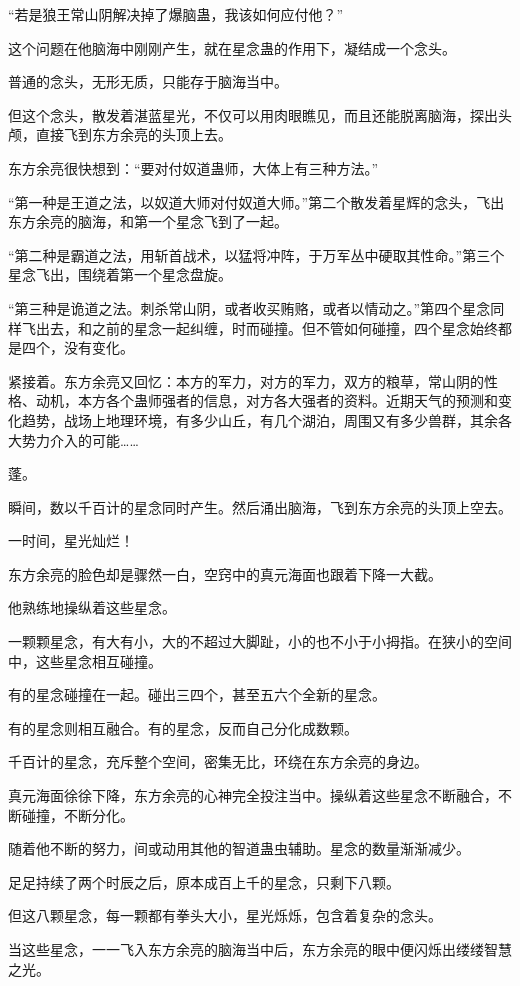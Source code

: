 \begin{this_body}
“若是狼王常山阴解决掉了爆脑蛊，我该如何应付他？”

这个问题在他脑海中刚刚产生，就在星念蛊的作用下，凝结成一个念头。

普通的念头，无形无质，只能存于脑海当中。

但这个念头，散发着湛蓝星光，不仅可以用肉眼瞧见，而且还能脱离脑海，探出头颅，直接飞到东方余亮的头顶上去。

东方余亮很快想到：“要对付奴道蛊师，大体上有三种方法。”

“第一种是王道之法，以奴道大师对付奴道大师。”第二个散发着星辉的念头，飞出东方余亮的脑海，和第一个星念飞到了一起。

“第二种是霸道之法，用斩首战术，以猛将冲阵，于万军丛中硬取其性命。”第三个星念飞出，围绕着第一个星念盘旋。

“第三种是诡道之法。刺杀常山阴，或者收买贿赂，或者以情动之。”第四个星念同样飞出去，和之前的星念一起纠缠，时而碰撞。但不管如何碰撞，四个星念始终都是四个，没有变化。

紧接着。东方余亮又回忆：本方的军力，对方的军力，双方的粮草，常山阴的性格、动机，本方各个蛊师强者的信息，对方各大强者的资料。近期天气的预测和变化趋势，战场上地理环境，有多少山丘，有几个湖泊，周围又有多少兽群，其余各大势力介入的可能……

蓬。

瞬间，数以千百计的星念同时产生。然后涌出脑海，飞到东方余亮的头顶上空去。

一时间，星光灿烂！

东方余亮的脸色却是骤然一白，空窍中的真元海面也跟着下降一大截。

他熟练地操纵着这些星念。

一颗颗星念，有大有小，大的不超过大脚趾，小的也不小于小拇指。在狭小的空间中，这些星念相互碰撞。

有的星念碰撞在一起。碰出三四个，甚至五六个全新的星念。

有的星念则相互融合。有的星念，反而自己分化成数颗。

千百计的星念，充斥整个空间，密集无比，环绕在东方余亮的身边。

真元海面徐徐下降，东方余亮的心神完全投注当中。操纵着这些星念不断融合，不断碰撞，不断分化。

随着他不断的努力，间或动用其他的智道蛊虫辅助。星念的数量渐渐减少。

足足持续了两个时辰之后，原本成百上千的星念，只剩下八颗。

但这八颗星念，每一颗都有拳头大小，星光烁烁，包含着复杂的念头。

当这些星念，一一飞入东方余亮的脑海当中后，东方余亮的眼中便闪烁出缕缕智慧之光。


\end{this_body}
